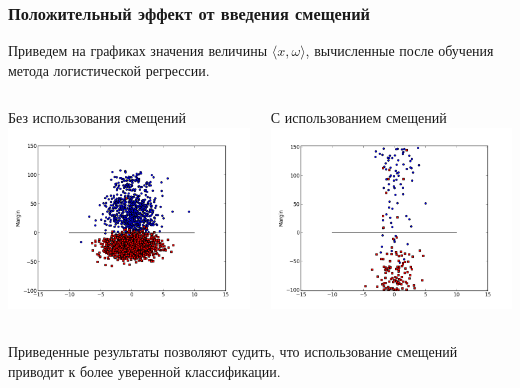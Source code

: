 \documentclass{beamer}
\begin{document}
\begin{frame}
\frametitle{Положительный эффект от введения смещений}
Приведем на графиках значения величины $\langle x,\omega \rangle$, вычисленные после обучения метода логистической регрессии.
 \begin{columns}[T]
    \begin{column}{.5\textwidth}
    \begin{block}{Без использования смещений}
    \includegraphics[width=\linewidth,height=\textheight,keepaspectratio]{1.png}
    \end{block}
    \end{column}
    \begin{column}{.5\textwidth}
    \begin{block}{С использованием смещений}
    \includegraphics[width=\linewidth,height=\textheight,keepaspectratio]{2.png}
    \end{block}
    \end{column}
  \end{columns}
Приведенные результаты позволяют судить, что использование смещений приводит к более уверенной классификации.
\end{frame}
\end{document}
